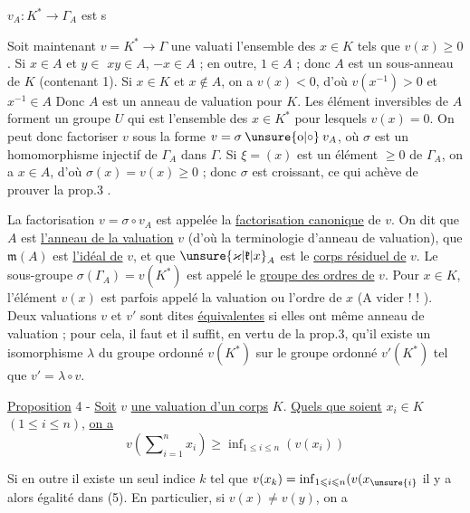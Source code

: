 
$v_A:K^*\longrightarrow\Gamma_A$ est s

Soit maintenant $v=K^*\longrightarrow\Gamma$ une valuati l'ensemble des $x\in K$ tels que $v(x)\geqslant0$. Si $x\in A$ et $y\in$  $xy\in A$, $-x\in A$ ; en outre, $1\in A$ ; donc $A$ est un sous-anneau de $K$ (contenant 1). Si $x\in K$ et $x\notin A$, on a $v(x)<0$, d'où $v(x^{-1})>0$ et $x^{-1}\in A$ Donc $A$ est un anneau de valuation pour $K$. Les élément inversibles de $A$ forment un groupe $U$ qui est l'ensemble des $x\in K^*$ pour lesquels $v(x)=0$. On peut donc factoriser $v$ sous la forme $v=\sigma\mathbin{\unsure{\mathrm{o}|\circ}}v_A$, où $\sigma$ est un homomorphisme injectif de $\Gamma_A$ dans $\Gamma$. Si $\xi=(x)$ est un élément $\geqslant0$ de $\Gamma_A$, on a $x\in A$, d'où $\sigma(x)=v(x)\geqslant0$ ; donc $\sigma$ est croissant, ce qui achève de prouver la prop.3 .

La factorisation $v=\sigma\circ v_A$ est appelée la \uline{factorisation canonique} de $v$. On dit que $A$ est \uline{l'anneau de la valuation} $v$ (d'où la terminologie d'anneau de valuation), que $\mathfrak{m}(A)$ est \uline{l'idéal de} $v$, et que $\unsure{\varkappa|\mathfrak{k}|x}_A$ est le \uline{corps résiduel de} $v$. Le sous-groupe $\sigma(\Gamma_A)=v(K^*)$ est appelé le \uline{groupe des ordres de} $v$. Pour $x\in K$, l'élément $v(x)$ est parfois appelé la valuation ou l'ordre de $x$ (A vider ! ! ). Deux valuations $v$ et $v'$ sont dites \uline{équivalentes} si elles ont même anneau de valuation ; pour cela, il faut et il suffit, en vertu de la prop.3, qu'il existe un isomorphisme $\lambda$ du groupe ordonné $v(K^*)$ sur le groupe ordonné $v'(K^*)$ tel que $v'=\lambda\circ v$.

\uline{Proposition} 4 - \uline{Soit} $v$ \uline{une valuation d'un corps} $K$. \uline{Quels que soient} $x_i\in K$ $(1\leqslant i\leqslant n)$, \uline{on a}
\[
v(\sum\nolimits_{i=1}^n x_i)\geqslant\inf\nolimits_{1\leqslant i\leqslant n}(v(x_i))\tag*{(5)}
\]

Si en outre il existe un seul indice $k$ tel que $v(x_k)=\inf_{1\leqslant i\leqslant n}(v(x_{\unsure{i}}$
il y a alors égalité dans (5). En particulier, si $v(x)\ne v(y)$, on a


